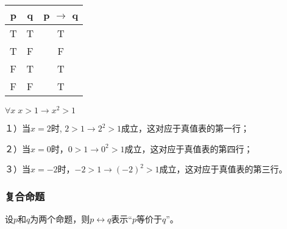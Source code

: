 \documentclass{beamer}
\begin{document}
\begin{CJK*}{UTF8}{gbsn}
\begin{frame}
    \begin{tabular}{cc|c}
    p& q& p $\to$ q\\
    \hline
    T&T&T\\
    T&F&F\\
    F&T&T\\
    F&F&T\\
    \end{tabular}
    \begin{minipage}{0.8\linewidth}
      \pause
      $\forall x \; x > 1 \to x^2 > 1$

      \pause
      １）当$x=2$时, $2 > 1 \to 2^2 >1$成立，这对应于真值表的第一行；

      \pause
    ２）当$x=0$时，$0 > 1 \to 0^2 > 1$成立，这对应于真值表的第四行；

      \pause
    ３）当$x=-2$时，$-2>1 \to (-2)^2 > 1$成立，这对应于真值表的第三行。
    \end{minipage}
   
  \end{frame}
  \begin{frame}
      \frametitle{复合命题}
    设$p$和$q$为两个命题，则$p\leftrightarrow q$表示“$p$等价于$q$”。  


\end{frame}
\end{CJK*}
\end{document}
